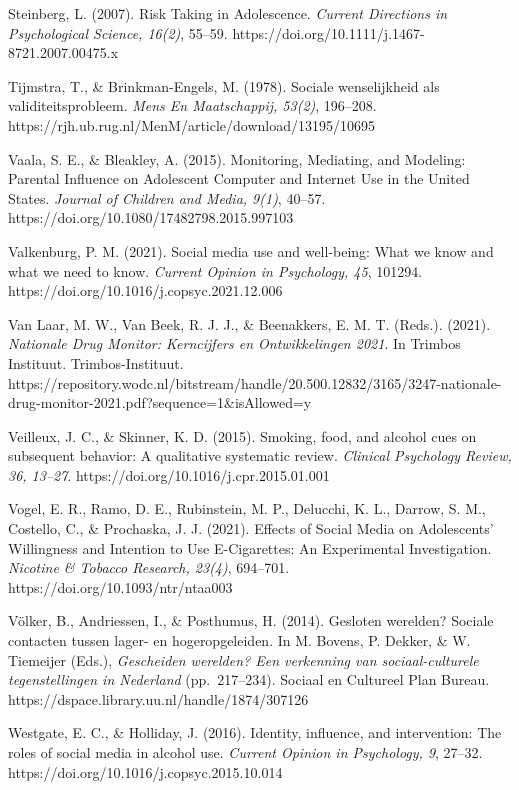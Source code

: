 \documentclass[
  letterpaper,
  DIV=11,
  numbers=noendperiod]{scrartcl}
\begin{document}
Steinberg, L. (2007). Risk Taking in Adolescence. \emph{Current
Directions in Psychological Science, 16(2)}, 55--59.
https://doi.org/10.1111/j.1467-8721.2007.00475.x

Tijmstra, T., \& Brinkman-Engels, M. (1978). Sociale wenselijkheid als
validiteitsprobleem. \emph{Mens En Maatschappij, 53(2)}, 196--208.
https://rjh.ub.rug.nl/MenM/article/download/13195/10695

Vaala, S. E., \& Bleakley, A. (2015). Monitoring, Mediating, and
Modeling: Parental Influence on Adolescent Computer and Internet Use in
the United States. \emph{Journal of Children and Media, 9(1)}, 40--57.
https://doi.org/10.1080/17482798.2015.997103

Valkenburg, P. M. (2021). Social media use and well-being: What we know
and what we need to know. \emph{Current Opinion in Psychology, 45},
101294. https://doi.org/10.1016/j.copsyc.2021.12.006

Van Laar, M. W., Van Beek, R. J. J., \& Beenakkers, E. M. T. (Reds.).
(2021). \emph{Nationale Drug Monitor: Kerncijfers en Ontwikkelingen
2021}. In Trimbos Instituut. Trimbos-Instituut.
https://repository.wodc.nl/bitstream/handle/20.500.12832/3165/3247-nationale-drug-monitor-2021.pdf?sequence=1\&isAllowed=y

Veilleux, J. C., \& Skinner, K. D. (2015). Smoking, food, and alcohol
cues on subsequent behavior: A qualitative systematic review.
\emph{Clinical Psychology Review, 36, 13--27}.
https://doi.org/10.1016/j.cpr.2015.01.001

Vogel, E. R., Ramo, D. E., Rubinstein, M. P., Delucchi, K. L., Darrow,
S. M., Costello, C., \& Prochaska, J. J. (2021). Effects of Social Media
on Adolescents' Willingness and Intention to Use E-Cigarettes: An
Experimental Investigation. \emph{Nicotine \& Tobacco Research, 23(4)},
694--701. https://doi.org/10.1093/ntr/ntaa003

Völker, B., Andriessen, I., \& Posthumus, H. (2014). Gesloten werelden?
Sociale contacten tussen lager- en hogeropgeleiden. In M. Bovens, P.
Dekker, \& W. Tiemeijer (Eds.), \emph{Gescheiden werelden? Een
verkenning van sociaal-culturele tegenstellingen in Nederland}
(pp.~217--234). Sociaal en Cultureel Plan Bureau.
https://dspace.library.uu.nl/handle/1874/307126

Westgate, E. C., \& Holliday, J. (2016). Identity, influence, and
intervention: The roles of social media in alcohol use. \emph{Current
Opinion in Psychology, 9}, 27--32.
https://doi.org/10.1016/j.copsyc.2015.10.014
\end{document}
